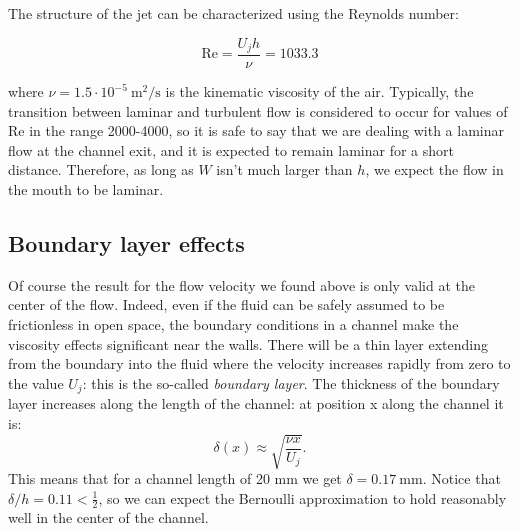 \documentclass[a4paper]{article}
\begin{document}
The structure of the jet can be characterized using the Reynolds number:

$$ \mathrm{Re} = \frac{U_j h}{\nu} = 1033.3 $$

where $\nu = 1.5 \cdot 10^{-5}~ \si{\meter\squared\per\second}$ is the kinematic viscosity of the air. Typically, the transition between laminar and turbulent flow is considered to occur for values of Re in the range 2000-4000, so it is safe to say that we are dealing with a laminar flow at the channel exit, and it is expected to remain laminar for a short distance. Therefore, as long as $W$ isn't much larger than $h$, we expect the flow in the mouth to be laminar. 

\subsection{Boundary layer effects}
Of course the result for the flow velocity we found above is only valid at the center of the flow. Indeed, even if the fluid can be safely assumed to be frictionless in open space, the boundary conditions in a channel make the viscosity effects significant near the walls. There will be a thin layer extending from the boundary into the fluid where the velocity increases rapidly from zero to the value $U_j$: this is the so-called \emph{boundary layer}. The thickness of the boundary layer increases along the length of the channel: at position x along the channel it is:
$$ \delta(x) \approx \sqrt{\frac{\nu x}{U_j}}. $$
This means that for a channel length of 20 mm we get $\delta = \SI{0.17}{\milli\meter}$. Notice that $\delta/h = 0.11 < \frac{1}{2}$, so we can expect the Bernoulli approximation to hold reasonably well in the center of the channel.
\end{document}
